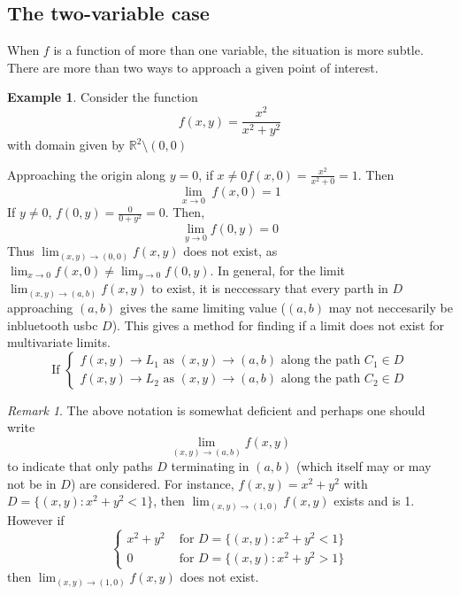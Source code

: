 \documentclass{report}
\theoremstyle{definition}
\newtheorem{example}{Example}
\theoremstyle{plain}
\theoremstyle{remark}
\newtheorem*{remark}{Remark}
\begin{document}
    \subsection{The two-variable case}
    When $ f $ is a function of more than one variable, the situation is more
    subtle. There are more than two ways to approach a given point of interest.
    \begin{example}
    Consider the function
    $$ f(x,y) = \frac{x^2}{x^2 + y^2} $$
    with domain given by $ \mathbb{R}^2 \setminus {(0,0)} $
    \end{example}
    Approaching the origin along $ y = 0 $, if $ x \neq 0  f(x,0)
    = \displaystyle \frac{x^2}{x^2 + 0} = 1$. Then 
    $$ \lim_{x\to 0} \; f(x,0) = 1 $$
    If $ y \neq 0  $, $ f(0,y) = \displaystyle \frac{0}{0+y^2} = 0 $. Then,
    $$ \lim_{y \to 0}  f(0,y) = 0 $$
    Thus $ \displaystyle \lim_{(x,y) \to (0,0)} f(x,y) $ does not exist, as
    $ \displaystyle \lim_{x\to 0} f(x,0) \neq \displaystyle \lim_{y\to 0}
    f(0,y) $. In general, for the limit $ \displaystyle \lim_{(x,y) \to (a,b)} 
    f(x,y)$ to exist, it is neccessary that every parth in $ D $ approaching
    $ (a,b) $ gives the same limiting value ($ (a,b) $ may not neccesarily be
    inbluetooth usbc $ D $). This gives a method for finding if a limit does not exist for
    multivariate limits.
    \[
      \text{If } \displaystyle \begin{cases}
      f(x,y) \to L_1 \text{ as } (x,y) \to (a,b) \text{ along the path } C_1
      \in D\\
      f(x,y) \to L_2 \text{ as } (x,y) \to (a,b) \text { along the path } C_2
      \in  D
    \end{cases} 
  \]
    \begin{remark}
  The above notation is somewhat deficient and perhaps one should write
  $$ \lim_{(x,y) \to (a,b)} f(x,y) $$
  to indicate that only paths $ D $ terminating in $ (a,b) $ (which itself may
  or may not be in $ D $) are considered. For instance,
  $ f(x,y) = x^2 + y^2 $ with $ D = \{(x,y): x^2 + y^2 < 1\} $, then
  $ \displaystyle \lim_{(x,y) \to (1,0)}  f(x,y) $ exists and is 1. However if 
 \[ 
    \begin{cases}
      x^2 + y^2 &\text{ for } D = \{(x,y): x^2 + y^2 < 1\}\\
      0 &\text{ for } D = \{(x,y): x^2 + y^2 > 1\}
    \end{cases}
    \]
    then $ \displaystyle \lim_{(x,y) \to (1,0)} f(x,y) $ does not exist.
  \end{remark}
\end{document}
